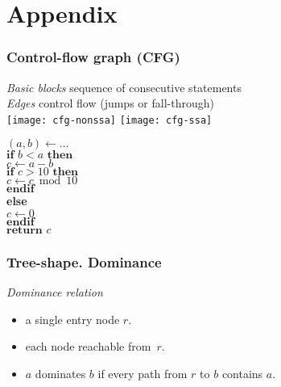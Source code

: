 \section*{Appendix}
\begin{frame}[noframenumbering,label=CFG]
\frametitle{Control-flow graph (CFG)}
%
\emph{Basic blocks} sequence of consecutive statements\\
\emph{Edges} control flow (jumps or fall-through)\\
\vfill
\texttt{[image: cfg-nonssa]}\hfill
\texttt{[image: cfg-ssa]}\hfill
\begin{minipage}[t]{0.25\textwidth}
\footnotesize
\textperiodcentered$(a,b)\gets \ldots$\\
\textperiodcentered$\textbf{if } b<a\textbf{ then}$\\
\textperiodcentered\hspace{1em}$c\gets a-b$\\
\textperiodcentered\hspace{1em}$\textbf{if } c>10\textbf{ then}$\\
\textperiodcentered\hspace{2em}$c \gets c \bmod 10$\\
\textperiodcentered\hspace{1em}$\textbf{endif}$\\
\textperiodcentered\textbf{else}\\
\textperiodcentered\hspace{1em}$c\gets 0$\\
\textperiodcentered$\textbf{endif}$\\
\textperiodcentered$\textbf{return } c$
\end{minipage}
\end{frame}

\begin{frame}[noframenumbering,label=DomTree]
\frametitle{Tree-shape. Dominance}

\begin{minipage}{0.48\textwidth}
    \emph{Dominance relation}
    \begin{itemize}
    \item a single entry node $r$.
    \item each node reachable from~$r$.
    \item $a$ dominates $b$ if every path from $r$ to $b$ contains $a$.
    \end{itemize}
    
\end{minipage}
\hfill
\begin{minipage}{0.5\textwidth}
%
%
%
\end{minipage}
\end{frame}

